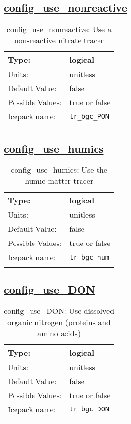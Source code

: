 \subsection[config\_use\_nonreactive]{\hyperref[sec:nm_tab_biogeochemistry]{config\_use\_nonreactive}}
\label{subsec:nm_sec_config_use_nonreactive}
\begin{center}
\begin{longtable}{| p{2.0in} || p{4.0in} |}
    \hline
    Type: & logical \\
    \hline
    Units: & \si{unitless} \\
    \hline
    Default Value: & false \\
    \hline
    Possible Values: & true or false \\
    \hline
    \hline
    Icepack name: & \verb+tr_bgc_PON+ \\
    \caption{config\_use\_nonreactive: Use a non-reactive nitrate tracer}
\end{longtable}
\end{center}
\subsection[config\_use\_humics]{\hyperref[sec:nm_tab_biogeochemistry]{config\_use\_humics}}
\label{subsec:nm_sec_config_use_humics}
\begin{center}
\begin{longtable}{| p{2.0in} || p{4.0in} |}
    \hline
    Type: & logical \\
    \hline
    Units: & \si{unitless} \\
    \hline
    Default Value: & false \\
    \hline
    Possible Values: & true or false \\
    \hline
    \hline
    Icepack name: & \verb+tr_bgc_hum+ \\
    \caption{config\_use\_humics: Use the humic matter tracer}
\end{longtable}
\end{center}
\subsection[config\_use\_DON]{\hyperref[sec:nm_tab_biogeochemistry]{config\_use\_DON}}
\label{subsec:nm_sec_config_use_DON}
\begin{center}
\begin{longtable}{| p{2.0in} || p{4.0in} |}
    \hline
    Type: & logical \\
    \hline
    Units: & \si{unitless} \\
    \hline
    Default Value: & false \\
    \hline
    Possible Values: & true or false \\
    \hline
    \hline
    Icepack name: & \verb+tr_bgc_DON+ \\
    \caption{config\_use\_DON: Use dissolved organic nitrogen (proteins and amino acids)}
\end{longtable}
\end{center}
